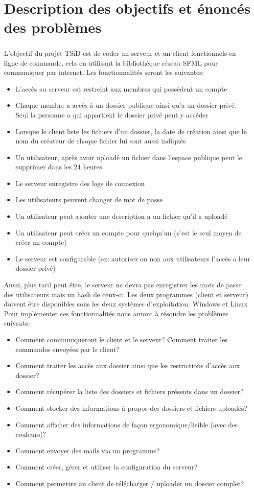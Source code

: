 \documentclass[12pt,a4paper,twoside]{article}
\begin{document}
	\section{Description des objectifs et énoncés des problèmes} %
		\subparagraph*{}
			L'objectif du projet TSiD est de coder un serveur et un client fonctionnels en ligne de commande, cela en utilisant la bibliothèque réseau SFML pour communiquer par internet.
			Les fonctionnalités seront les suivantes:
			\begin{itemize}
				\item{} L'accès au serveur est restreint aux membres qui possèdent un compte
				\item{} Chaque membre a accès à un dossier publique ainsi qu'a un dossier privé. Seul la personne a qui appartient le dossier privé peut y accéder
				\item{} Lorsque le client liste les fichiers d'un dossier, la date de création ainsi que le nom du créateur de chaque fichier lui sont aussi indiqués
				\item{} Un utilisateur, après avoir uploadé un fichier dans l'espace publique peut le supprimer dans les 24 heures
				\item{} Le serveur enregistre des logs de connexion
				\item{} Les utilisateurs peuvent changer de mot de passe
				\item{} Un utilisateur peut ajouter une description a un fichier qu'il a uploadé
				\item{} Un utilisateur peut créer un compte pour quelqu'un (c'est le seul moyen de créer un compte)
				\item{} Le serveur est configurable (ex: autoriser ou non aux utilisateurs l'accès a leur dossier privé)
			\end{itemize}
			Aussi, plus tard peut être, le serveur ne devra pas enregistrer les mots de passe des utilisateurs mais un hash de ceux-ci.
			Les deux programmes (client et serveur) doivent être disponibles sous les deux systèmes d'exploitation: Windows et Linux
			Pour implémenter ces fonctionnalités nous auront à résoudre les problèmes suivants:
			\begin{itemize}
				\item{} Comment communiqueront le client et le serveur? Comment traiter les commandes envoyées par le client?
				\item{} Comment traiter les accès aux dossier ainsi que les restrictions d'accès aux dossier?
				\item{} Comment récupérer la liste des dossiers et fichiers présents dans un dossier?
				\item{} Comment stocker des informations à propos des dossiers et fichiers uploadés?
				\item{} Comment afficher des informations de façon ergonomique/lisible (avec des couleurs)?
				\item{} Comment envoyer des mails via un programme?
				\item{} Comment créer, gérer et utiliser la configuration du serveur?
				\item{} Comment permettre au client de télécharger / uploader un dossier complet?
			\end{itemize}
\end{document}
